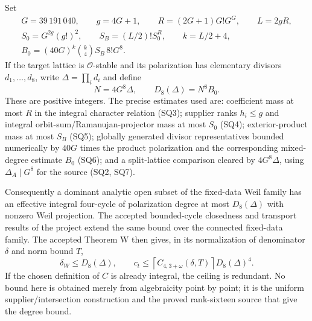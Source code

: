 Set
\[
\begin{gathered}
 G=39\,191\,040,\qquad g=4G+1,\qquad
 R=(2G+1)G!G^G,\qquad L=2gR,\\
 S_0=G^{2g}(g!)^2,\qquad S_B=(L/2)!S_0^R,\qquad k=L/2+4,\\
 B_0=(40G)^k\binom{k}{4}S_B\,8!G^8.
\end{gathered}
\]
If the target lattice is \(\mathcal O\)-stable and its polarization has
elementary divisors \(d_1,\ldots,d_8\), write
\(\Delta=\prod_i d_i\) and define
\[
             N=4G^8\Delta,\qquad
             \boxed{D_8(\Delta)=N^8B_0.}
\]
These are positive integers.  The precise estimates used are: coefficient
mass at most \(R\) in the integral character relation (SQ3); supplier ranks
\(h_i\le g\) and integral orbit-sum/Ramanujan-projector mass at most
\(S_0\) (SQ4); exterior-product mass at most \(S_B\) (SQ5); globally
generated divisor representatives bounded numerically by \(40G\) times the
product polarization and the corresponding mixed-degree estimate \(B_0\)
(SQ6); and a split-lattice comparison cleared by \(4G^8\Delta\), using
\(\Delta_A\mid G^8\) for the source (SQ2, SQ7).

Consequently a dominant analytic open subset of the fixed-data Weil family
has an effective integral four-cycle of polarization degree at most
\(D_8(\Delta)\) with nonzero Weil projection.  The accepted bounded-cycle
closedness and transport results of the project extend the same bound over
the connected fixed-data family.  The accepted Theorem W then gives, in
its normalization of denominator \(\delta\) and norm bound \(T\),
\[
       \delta_W\le D_8(\Delta),\qquad
       c_t\le \left\lceil C_{4,3+\omega}(\delta,T)\right\rceil
                       D_8(\Delta)^4.
\]
If the chosen definition of \(C\) is already integral, the ceiling is
redundant.  No bound here is obtained merely from algebraicity point by point;
it is the uniform supplier/intersection construction and the proved
rank-sixteen source that give the degree bound.

